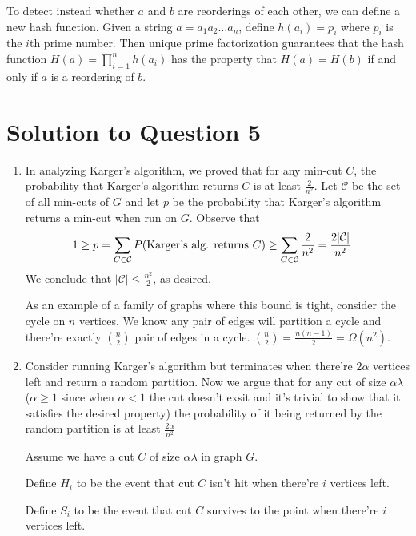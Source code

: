 \documentclass[11pt]{article}
\begin{document}
To detect instead whether $a$ and $b$ are reorderings of each other, we can define a new hash function.
Given a string $a = a_1a_2 \dots a_n$, define $h(a_i) = p_i$ where $p_i$ is the $i$th prime number.
Then unique prime factorization guarantees that the hash function $H(a) = \prod_{i = 1}^n h(a_i)$ has the property that $H(a) = H(b)$ if and only if $a$ is a reordering of $b$.

\newpage
\section{Solution to Question 5}

\begin{enumerate}
  \item In analyzing Karger's algorithm, we proved that for any min-cut $C$, the probability that Karger's algorithm returns $C$ is at least $\frac{2}{n^2}$.
    Let $\mathcal{C}$ be the set of all min-cuts of $G$ and let $p$ be the probability that Karger's algorithm returns a min-cut when run on $G$.
    Observe that
    \begin{align*}
    1 \geq p &= \sum_{C \in \mathcal{C}} P(\textnormal{Karger's alg. returns } C) \geq \sum_{C \in \mathcal{C}}\frac{2}{n^2} = \frac{2|\mathcal{C}|}{n^2}
    \end{align*}
    We conclude that $|\mathcal{C}| \leq \frac{n^2}{2}$, as desired.

    As an example of a family of graphs where this bound is tight, consider the cycle on $n$ vertices.
    We know any pair of edges will partition a cycle and there're exactly ${n \choose 2}$ pair of edges in a cycle.
    ${n \choose 2} = \frac{n(n-1)}{2} = \Omega(n^2)$.
  \item Consider running Karger's algorithm but terminates when there're $2\alpha$ vertices left and return a random partition.
    Now we argue that for any cut of size $\alpha \lambda$ ($\alpha \ge 1$ since when $\alpha < 1$ the cut doesn't exsit and it's trivial to show that it satisfies the desired property) the probability of it being returned by the random partition is at least $\frac{2\alpha}{n^2}$

    Assume we have a cut $C$ of size $\alpha \lambda$ in graph $G$.

    Define $H_i$ to be the event that cut $C$ isn't hit when there're $i$ vertices left.

    Define $S_i$ to be the event that cut $C$ survives to the point when there're $i$ vertices left.


\end{enumerate}
\end{document}
